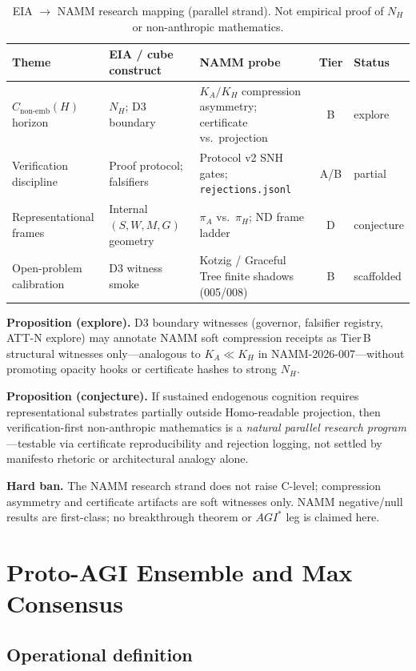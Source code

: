 \documentclass[11pt,a4paper]{article}
\theoremstyle{definition}
\begin{document}
\begin{table}[H]
\centering\scriptsize
\begin{tabular}{lp{2.5cm}p{2.8cm}cl}
\toprule Theme & EIA / cube construct & NAMM probe & Tier & Status \\ \midrule
$C_{\mathrm{non\text{-}emb}}(H)$ horizon & $N_H$; D3 boundary & $K_A/K_H$ compression asymmetry; certificate vs.\ projection & B & explore \\
Verification discipline & Proof protocol; falsifiers & Protocol v2 SNH gates; \texttt{rejections.jsonl} & A/B & partial \\
Representational frames & Internal $(S,W,M,G)$ geometry & $\pi_A$ vs.\ $\pi_H$; ND frame ladder & D & conjecture \\
Open-problem calibration & D3 witness smoke & Kotzig / Graceful Tree finite shadows (005/008) & B & scaffolded \\ \bottomrule
\end{tabular}
\caption{EIA $\to$ NAMM research mapping (parallel strand). Not empirical proof of $N_H$ or non-anthropic mathematics.}
\label{tab:namm-mapping}
\end{table}

\textbf{Proposition (explore).} D3 boundary witnesses (governor, falsifier registry, ATT-N explore) may annotate NAMM soft compression receipts as Tier\,B structural witnesses only---analogous to $K_A \ll K_H$ in NAMM-2026-007---without promoting opacity hooks or certificate hashes to strong $N_H$.

\textbf{Proposition (conjecture).} If sustained endogenous cognition requires representational substrates partially outside Homo-readable projection, then verification-first non-anthropic mathematics is a \emph{natural parallel research program}---testable via certificate reproducibility and rejection logging, not settled by manifesto rhetoric or architectural analogy alone.

\textbf{Hard ban.} The NAMM research strand does not raise C-level; compression asymmetry and certificate artifacts are soft witnesses only. NAMM negative/null results are first-class; no breakthrough theorem or $AGI^{*}$ leg is claimed here.

\section{Proto-AGI Ensemble and Max Consensus}\label{sec:ensemble}

\subsection{Operational definition}
\end{document}
